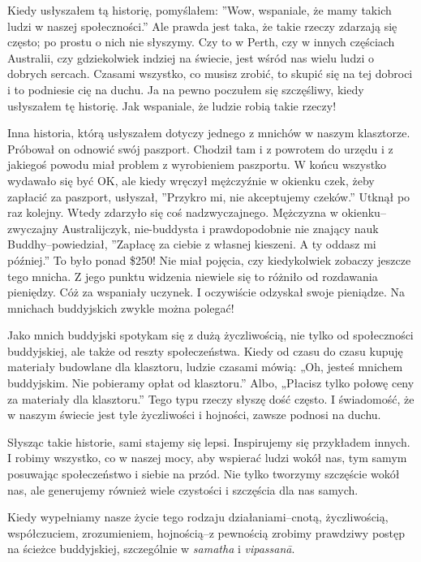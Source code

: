\documentclass[12pt,openany]{book}
\begin{document}
Kiedy usłyszałem tą historię, pomyślałem: ”Wow, wspaniale, że mamy takich ludzi w naszej społeczności.” Ale prawda jest taka, że takie rzeczy zdarzają się często; po prostu o nich nie słyszymy. Czy to w Perth, czy w innych częściach Australii, czy gdziekolwiek indziej na świecie, jest wśród nas wielu ludzi o dobrych sercach. Czasami wszystko, co musisz zrobić, to skupić się na tej dobroci i to podniesie cię na duchu. Ja na pewno poczułem się szczęśliwy, kiedy usłyszałem tę historię. Jak wspaniale, że ludzie robią takie rzeczy!

Inna historia, którą usłyszałem dotyczy jednego z mnichów w naszym klasztorze. Próbował on odnowić swój paszport. Chodził tam i z powrotem do urzędu i z jakiegoś powodu miał problem z wyrobieniem paszportu. W końcu wszystko wydawało się być OK, ale kiedy wręczył mężczyźnie w okienku czek, żeby zapłacić za paszport, usłyszał, ”Przykro mi, nie akceptujemy czeków.” Utknął po raz kolejny. Wtedy zdarzyło się coś nadzwyczajnego. Mężczyzna w okienku–zwyczajny Australijczyk, nie-buddysta i prawdopodobnie nie znający nauk Buddhy–powiedział, ”Zapłacę za ciebie z własnej kieszeni. A ty oddasz mi później.” To było ponad \$250! Nie miał pojęcia, czy kiedykolwiek zobaczy jeszcze tego mnicha. Z jego punktu widzenia niewiele się to różniło od rozdawania pieniędzy. Cóż za wspaniały uczynek. I oczywiście odzyskał swoje pieniądze. Na mnichach buddyjskich zwykle można polegać!

Jako mnich buddyjski spotykam się z dużą życzliwością, nie tylko od społeczności buddyjskiej, ale także od reszty społeczeństwa. Kiedy od czasu do czasu kupuję materiały budowlane dla klasztoru, ludzie czasami mówią: „Oh, jesteś mnichem buddyjskim. Nie pobieramy opłat od klasztoru.” Albo, „Płacisz tylko połowę ceny za materiały dla klasztoru.” Tego typu rzeczy słyszę dość często. I świadomość, że w naszym świecie jest tyle życzliwości i hojności, zawsze podnosi na duchu. 

Słysząc takie historie, sami stajemy się lepsi. Inspirujemy się przykładem innych. I robimy wszystko, co w naszej mocy, aby wspierać ludzi wokół nas, tym samym posuwając społeczeństwo i siebie na przód. Nie tylko tworzymy szczęście wokół nas, ale generujemy również wiele czystości i szczęścia dla nas samych.

Kiedy wypełniamy nasze życie tego rodzaju działaniami–cnotą, życzliwością, współczuciem, zrozumieniem, hojnością–z pewnością zrobimy prawdziwy postęp na ścieżce buddyjskiej, szczególnie w \textit{samatha} i \textit{vipassanā}.
\end{document}

